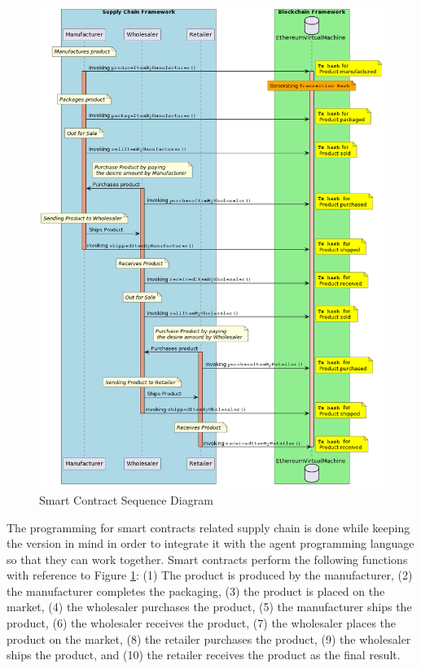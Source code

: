 \vspace{.5cm}

    \begin{figure}[h!]
    \centering
      \includegraphics[width=12cm]{includes/figures/Sequence Diagram.png} 
      \caption{Smart Contract Sequence Diagram}
      \label{Smart Contract Sequence Diagram}
    \end{figure}
    
\vspace{.5cm}

The programming for smart contracts related supply chain is done while keeping the version in mind in order to integrate it with the agent programming language so that they can work together. Smart contracts perform the following functions with reference to Figure \ref{Smart Contract Sequence Diagram}: (1) The product is produced by the manufacturer, (2) the manufacturer completes the packaging, (3) the product is placed on the market, (4) the wholesaler purchases the product, (5) the manufacturer ships the product, (6) the wholesaler receives the product, (7) the wholesaler places the product on the market, (8) the retailer purchases the product, (9) the wholesaler ships the product, and (10) the retailer receives the product as the final result.

